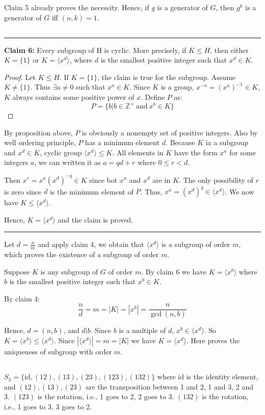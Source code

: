 \documentclass[12pt]{article}
\begin{document}
Claim 5 already proves the necessity. Hence, if $g$ is a generator of $G$, then $g^k$ is a generator of $G$ iff $(n,k)=1$.
\subsection{} %

\noindent\rule{\textwidth}{1pt}
\noindent\textbf{Claim 6: }Every subgroup of H is cyclic. More precisely, if $K\le H$, then either $K=\{1\}$ or $K =\langle x^d\rangle$, where $d$ is the smallest positive integer such that $x^d\in K$.
\begin{proof}
Let $K\le H$. If $K=\{1\}$, the claim is true for the subgroup. Assume $K\ne \{1\}$. Thus $\exists a\ne 0$ such that $x^a\in K$. Since $K$ is a group, $x^{-a}=(x^a)^{-1}\in K$, $K$ always contains some positive power of $x$. Define $P$ as:
$$P=\{b|b\in\mathbb{Z}^+\ \mathrm{and}\ x^b\in K\}$$
\end{proof}
By proposition above, $P$ is obviously a nonempty set of positive integers. Also by well ordering principle, $P$ has a minimum element $d$. Because $K$ ia a subgroup and $x^d\in K$, cyclic group $\langle x^d\rangle\le K$. All elements in $K$ have the form $x^a$ for some integers $a$, we can written it as $a=qd+r$ where $0\le r < d$.

Then $x^r=x^a(x^d)^{-q}\in K$ since bot $x^a$ and $x^d$ are in $K$. The only possibility of $r$ is zero since $d$ is the minimum element of $P$. Thus, $x^a=(x^d)^q\in \langle x^d\rangle$. We now have $K\le \langle x^d\rangle$.

Hence, $K=\langle x^d\rangle$ and the claim is proved.

\noindent\rule{\textwidth}{1pt}

Let $d=\frac{n}{m}$ and apply claim 4, we obtain that $\langle x^d\rangle$ is a subgroup of order $m$, which proves the existence of a subgroup of order $m$.

Suppose $K$ is any subgroup of $G$ of order $m$. By claim 6 we have $K=\langle x^b\rangle$ where $b$ is the smallest positive integer such that $x^b\in K$.

By claim 4:
$$\frac{n}{d}=m=|K|=|x^b|=\frac{n}{\gcd{(n,b)}}$$

Hence, $d=(n,b)$, and $d|b$. Since $b$ is a multiple of $d$, $x^b\in\langle x^d\rangle$. So $K=\langle x^b\rangle\le \langle x^d\rangle$.
Since $|\langle x^d\rangle|=m=|K|$ we have $K=\langle x^d\rangle$. Here proves the uniqueness of subgroup with order $m$.

\subsection{} %
$S_3=\{\mathrm{id},(12),(13),(23),(123),(132)\}$ where $\mathrm{id}$ is the identity element, and $(12), (13), (23)$ are the transposition between 1 and 2, 1 and 3, 2 and 3. $(123)$ is the rotation, i.e., 1 goes to 2, 2 goes to 3. $(132)$ is the rotation, i.e., 1 goes to 3, 3 goes to 2.
\end{document}
